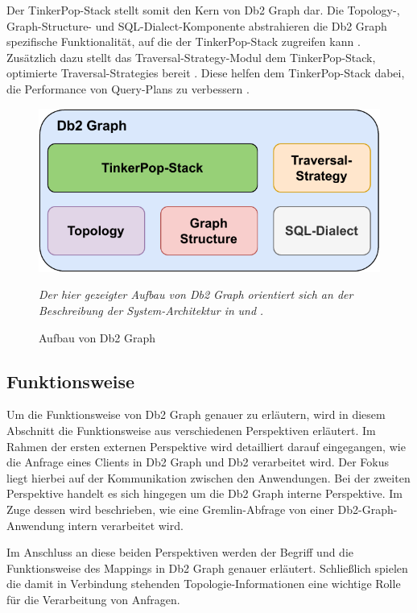 Der TinkerPop-Stack stellt somit den Kern von Db2 Graph dar. Die Topology-, Graph-Structure- und SQL-Dialect-Komponente abstrahieren die Db2 Graph spezifische Funktionalität, auf die der TinkerPop-Stack zugreifen kann \cite{sigmod_tian}. Zusätzlich dazu stellt das Traversal-Strategy-Modul dem TinkerPop-Stack, optimierte Traversal-Strategies bereit \cite{sigmod_tian}. Diese helfen dem TinkerPop-Stack dabei, die Performance von Query-Plans zu verbessern \cite{sigmod_tian}.

\begin{figure}[ht]
    \centering
    \includegraphics[width=\textwidth]{images/db2graph_components.pdf}
    \caption{Aufbau von Db2 Graph}
    \label{fig:db2graph_aufbau}
    \vspace{0.5em}
    \textit{Der hier gezeigter Aufbau von Db2 Graph   orientiert sich an der Beschreibung der System-Architektur in} \cite{vldb_tian} \textit{und} \cite{sigmod_tian}\textit{.}
\end{figure}

\subsection{Funktionsweise}
\label{db2graph:funktionsweise}
Um die Funktionsweise von Db2 Graph genauer zu erläutern, wird in diesem Abschnitt die Funktionsweise aus verschiedenen Perspektiven erläutert. Im Rahmen der ersten externen Perspektive wird detailliert darauf eingegangen, wie die Anfrage eines Clients in Db2 Graph und Db2 verarbeitet wird. Der Fokus liegt hierbei auf der Kommunikation zwischen den Anwendungen. Bei der zweiten Perspektive handelt es sich hingegen um die Db2 Graph interne Perspektive. Im Zuge dessen wird beschrieben, wie eine Gremlin-Abfrage von einer Db2-Graph-Anwendung intern verarbeitet wird. 

Im Anschluss an diese beiden Perspektiven werden der Begriff und die Funktionsweise des Mappings in Db2 Graph genauer erläutert. Schließlich spielen die damit in Verbindung stehenden Topologie-Informationen eine wichtige Rolle für die Verarbeitung von Anfragen.

